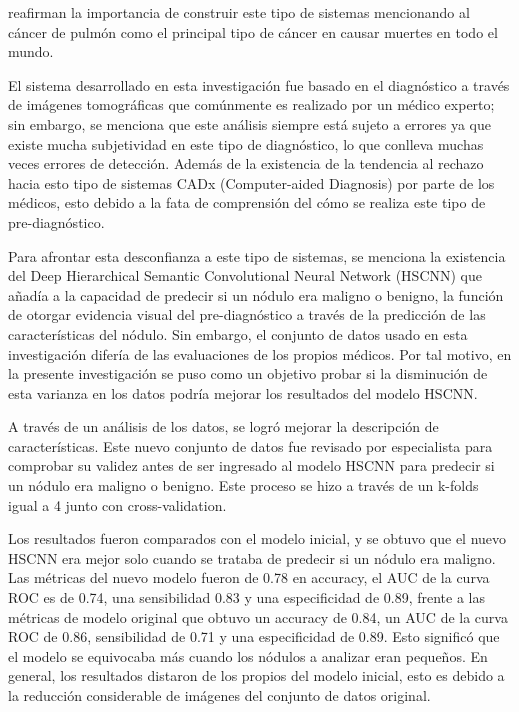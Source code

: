 \cite{pr_felgueiras20193dlungnod} reafirman la importancia de construir este tipo de sistemas mencionando al cáncer de pulmón como el principal tipo de cáncer en causar muertes en todo el mundo.

El sistema desarrollado en esta investigación fue basado en el diagnóstico a través de imágenes tomográficas que comúnmente es realizado por un médico experto; sin embargo, se menciona que este análisis siempre está sujeto a errores ya que existe mucha subjetividad en este tipo de diagnóstico, lo que conlleva muchas veces errores de detección. Además de la existencia de la tendencia al rechazo hacia esto tipo de sistemas CADx (Computer-aided Diagnosis) por parte de los médicos, esto debido a la fata de comprensión del cómo se realiza este tipo de pre-diagnóstico.

Para afrontar esta desconfianza a este tipo de sistemas, se menciona la existencia del Deep Hierarchical Semantic Convolutional Neural Network (HSCNN) que añadía a la capacidad de predecir si un nódulo era maligno o benigno, la función de otorgar evidencia visual del pre-diagnóstico a través de la predicción de las características del nódulo. Sin embargo, el conjunto de datos usado en esta investigación difería de las evaluaciones de los propios médicos. Por tal motivo, en la presente investigación se puso como un objetivo probar si la disminución de esta varianza en los datos podría mejorar los resultados del modelo HSCNN.

A través de un análisis de los datos, se logró mejorar la descripción de características. Este nuevo conjunto de datos fue revisado por especialista para comprobar su validez antes de ser ingresado al modelo HSCNN para predecir si un nódulo era maligno o benigno. Este proceso se hizo a través de un k-folds igual a 4 junto con cross-validation.

Los resultados fueron comparados con el modelo inicial, y se obtuvo que el nuevo HSCNN era mejor solo cuando se trataba de predecir si un nódulo era maligno. Las métricas del nuevo modelo fueron de 0.78 en accuracy, el AUC de la curva ROC es de 0.74, una sensibilidad 0.83 y una especificidad de 0.89, frente a las métricas de modelo original que obtuvo un accuracy de 0.84, un AUC de la curva ROC de 0.86, sensibilidad de 0.71 y una especificidad de 0.89. Esto significó que el modelo se equivocaba más cuando los nódulos a analizar eran pequeños. En general, los resultados distaron de los propios del modelo inicial, esto es debido a la reducción considerable de imágenes del conjunto de datos original. 

